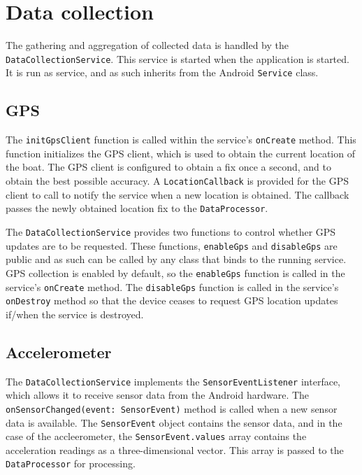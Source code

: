 \documentclass[11pt,twoside,a4paper]{report}
\begin{document}
\section{Data collection}\label{DataProcessorkt}

The gathering and aggregation of collected data is handled by the \texttt{DataCollectionService}. This service is started when the application is started. It is run as service, and as such inherits from the Android \texttt{Service} class.

\subsection{GPS}

The \texttt{initGpsClient} function is called within the service's \texttt{onCreate} method. This function initializes the GPS client, which is used to obtain the current location of the boat. The GPS client is configured to obtain a fix once a second, and to obtain the best possible accuracy. A \texttt{LocationCallback} is provided for the GPS client to call to notify the service when a new location is obtained. The callback passes the newly obtained location fix to the \texttt{DataProcessor}.

The \texttt{DataCollectionService} provides two functions to control whether GPS updates are to be requested. These functions, \texttt{enableGps} and \texttt{disableGps} are public and as such can be called by any class that binds to the running service. GPS collection is enabled by default, so the \texttt{enableGps} function is called in the service's \texttt{onCreate} method. The \texttt{disableGps} function is called in the service's \texttt{onDestroy} method so that the device ceases to request GPS location updates if/when the service is destroyed.

\subsection{Accelerometer}

The \texttt{DataCollectionService} implements the \texttt{SensorEventListener} interface, which allows it to receive sensor data from the Android hardware. The \texttt{onSensorChanged(event: SensorEvent)} method is called when a new sensor data is available. The \texttt{SensorEvent} object contains the sensor data, and in the case of the accleerometer, the \texttt{SensorEvent.values} array contains the acceleration readings as a three-dimensional vector. This array is passed to the \texttt{DataProcessor} for processing.
\end{document}
